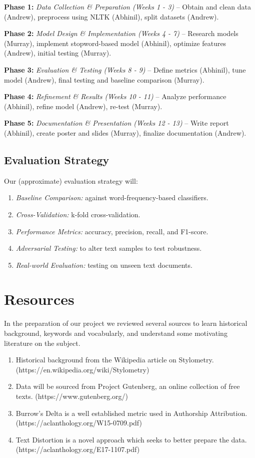 \documentclass[sigconf, nonacm]{acmart}
\begin{document}
\textbf{Phase 1:} \textit{Data Collection \& Preparation (Weeks 1 - 3)} -- Obtain and clean data (Andrew), preprocess using NLTK (Abhinil), split datasets (Andrew).

\textbf{Phase 2:} \textit{Model Design \& Implementation (Weeks 4 - 7)} -- Research models (Murray), implement stopword-based model (Abhinil), optimize features (Andrew), initial testing (Murray).

\textbf{Phase 3:} \textit{Evaluation \& Testing (Weeks 8 - 9)} -- Define metrics (Abhinil), tune model (Andrew), final testing and baseline comparison (Murray).

\textbf{Phase 4:} \textit{Refinement \& Results (Weeks 10 - 11)} -- Analyze performance (Abhinil), refine model (Andrew), re-test (Murray).

\textbf{Phase 5:} \textit{Documentation \& Presentation (Weeks 12 - 13)} -- Write report (Abhinil), create poster and slides (Murray), finalize documentation (Andrew).

\subsection{Evaluation Strategy}

Our (approximate) evaluation strategy will: 
\begin{enumerate}
  \item \textit{Baseline Comparison:} against word-frequency-based classifiers.
  \item \textit{Cross-Validation:} k-fold cross-validation.
  \item \textit{Performance Metrics:} accuracy, precision, recall, and F1-score.
  \item \textit{Adversarial Testing:} to alter text samples to test robustness.
  \item \textit{Real-world Evaluation:} testing on unseen text documents. 
\end{enumerate}

\section{Resources}

In the preparation of our project we reviewed several sources to learn historical background, keywords and vocabularly, and understand
some motivating literature on the subject. 

\begin{enumerate}
  \item Historical background from the Wikipedia article on Stylometry. (https://en.wikipedia.org/wiki/Stylometry)
  \item Data will be sourced from Project Gutenberg, an online collection of free texts. (https://www.gutenberg.org/)
  \item Burrow's Delta is a well established metric used in Authorship Attribution. (https://aclanthology.org/W15-0709.pdf)
  \item Text Distortion is a novel approach which seeks to better prepare the data. (https://aclanthology.org/E17-1107.pdf)
\end{enumerate}
\end{document}
